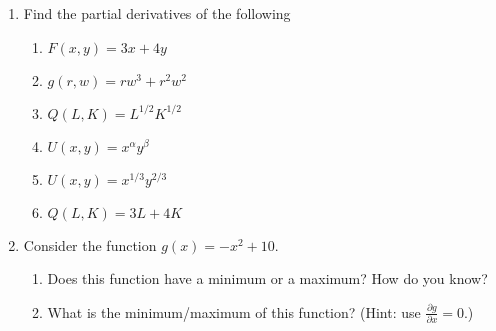 \documentclass[11pt]{article}
\begin{document}
\begin{enumerate}
  \newpage
  \item Find the partial derivatives of the following
  \begin{multicols}{2}
    \begin{enumerate}
      \item $F(x,y) = 3x + 4y$
      
      \vspace{25mm}
      \item $g(r,w) = rw^3 + r^2w^2$
      
      \vspace{25mm}
      \item $Q(L, K) = L^{1/2} K^{1/2}$

      \vspace{25mm}
      \item $U(x, y) = x^{\alpha} y^\beta$
      
      \vspace{25mm}
      \item $U(x, y) = x^{1/3} y^{2/3}$

      \vspace{25mm}
      \item $Q(L, K) = 3L + 4K$
    \end{enumerate}
  \end{multicols}  
  

  \vspace{40mm}
  \item Consider the function $g(x) = -x^2 + 10$.
  \begin{enumerate}
    \item Does this function have a minimum or a maximum? How do you know?
    
    \item What is the minimum/maximum of this function? (Hint: use $\frac{\partial g}{\partial x} = 0$.)
  \end{enumerate}
\end{enumerate}
\end{document}
